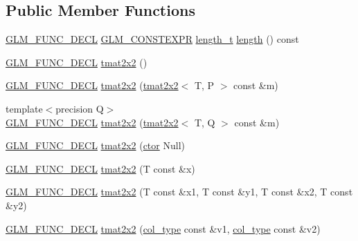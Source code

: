 \subsection*{Public Member Functions}
\begin{DoxyCompactItemize}
\item 
\hyperlink{setup_8hpp_ab2d052de21a70539923e9bcbf6e83a51}{G\+L\+M\+\_\+\+F\+U\+N\+C\+\_\+\+D\+E\+CL} \hyperlink{setup_8hpp_a08b807947b47031d3a511f03f89645ad}{G\+L\+M\+\_\+\+C\+O\+N\+S\+T\+E\+X\+PR} \hyperlink{namespaceglm_a090a0de2260835bee80e71a702492ed9}{length\+\_\+t} \hyperlink{structglm_1_1detail_1_1tmat2x2_a9d5d54591b86cea1a75c4239ea1ac120}{length} () const
\item 
\hyperlink{setup_8hpp_ab2d052de21a70539923e9bcbf6e83a51}{G\+L\+M\+\_\+\+F\+U\+N\+C\+\_\+\+D\+E\+CL} \hyperlink{structglm_1_1detail_1_1tmat2x2_a7510f65ba2b8a0a3f8197ec3a7f7c435}{tmat2x2} ()
\item 
\hyperlink{setup_8hpp_ab2d052de21a70539923e9bcbf6e83a51}{G\+L\+M\+\_\+\+F\+U\+N\+C\+\_\+\+D\+E\+CL} \hyperlink{structglm_1_1detail_1_1tmat2x2_ace6c970e91f6eace80227602531e4d8a}{tmat2x2} (\hyperlink{structglm_1_1detail_1_1tmat2x2}{tmat2x2}$<$ T, P $>$ const \&m)
\item 
{\footnotesize template$<$precision Q$>$ }\\\hyperlink{setup_8hpp_ab2d052de21a70539923e9bcbf6e83a51}{G\+L\+M\+\_\+\+F\+U\+N\+C\+\_\+\+D\+E\+CL} \hyperlink{structglm_1_1detail_1_1tmat2x2_a0273bde43902469715fd10c0fd06cac4}{tmat2x2} (\hyperlink{structglm_1_1detail_1_1tmat2x2}{tmat2x2}$<$ T, Q $>$ const \&m)
\item 
\hyperlink{setup_8hpp_ab2d052de21a70539923e9bcbf6e83a51}{G\+L\+M\+\_\+\+F\+U\+N\+C\+\_\+\+D\+E\+CL} \hyperlink{structglm_1_1detail_1_1tmat2x2_a6b5779f97416696975e15936e8c96e0a}{tmat2x2} (\hyperlink{structglm_1_1detail_1_1tmat2x2_ac7c2fd8babbf9207cf08ffb92497a6c8}{ctor} Null)
\item 
\hyperlink{setup_8hpp_ab2d052de21a70539923e9bcbf6e83a51}{G\+L\+M\+\_\+\+F\+U\+N\+C\+\_\+\+D\+E\+CL} \hyperlink{structglm_1_1detail_1_1tmat2x2_a8fe44c67c08b09a6e1086593b600582d}{tmat2x2} (T const \&x)
\item 
\hyperlink{setup_8hpp_ab2d052de21a70539923e9bcbf6e83a51}{G\+L\+M\+\_\+\+F\+U\+N\+C\+\_\+\+D\+E\+CL} \hyperlink{structglm_1_1detail_1_1tmat2x2_ac66f031aca7d5f0e52e92b0c9ab664a7}{tmat2x2} (T const \&x1, T const \&y1, T const \&x2, T const \&y2)
\item 
\hyperlink{setup_8hpp_ab2d052de21a70539923e9bcbf6e83a51}{G\+L\+M\+\_\+\+F\+U\+N\+C\+\_\+\+D\+E\+CL} \hyperlink{structglm_1_1detail_1_1tmat2x2_a98263653fc582781e4babe149a4fdd99}{tmat2x2} (\hyperlink{structglm_1_1detail_1_1tmat2x2_ae8c6de6197aa1b65adf15c40197c04d1}{col\+\_\+type} const \&v1, \hyperlink{structglm_1_1detail_1_1tmat2x2_ae8c6de6197aa1b65adf15c40197c04d1}{col\+\_\+type} const \&v2)

\end{DoxyCompactItemize}

